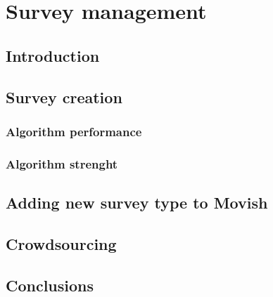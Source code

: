 \chapter{Survey management}
\label{chapter:<survey_management>}

\section{Introduction}
\label{sec:survey_management_introduction}

\section{Survey creation}
\label{sec:survey_creation}

\subsection{Algorithm performance}
\label{sec:algorithm_performance}

\subsection{Algorithm strenght}
\label{sec:algorithm_strenght}

\section{Adding new survey type to Movish}
\label{sec:adding_new_survey_type_to_Movish}

\section{Crowdsourcing}
\label{sec:crowdsourcing}

\section{Conclusions}
\label{sec:survey_management_conclusions}

\acresetall